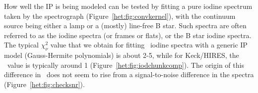 How well the IP is being modeled can be tested by fitting a pure
iodine spectrum taken by the spectrograph
(Figure~\ref{het:fig:convkernel}), with the continuum source being
either a lamp or a (mostly) line-free B star. Such spectra are often
referred to as the iodine spectra (or frames or flats), or the B star
iodine spectra. The typical $\chi_\nu^2$ value that we obtain for
fitting \het\ iodine spectra with a generic IP model (Gauss-Hermite
polynomials) is about 2-5, while for Keck/HIRES, the \chisq\ value is
typically around 1 (Figure~\ref{het:fig:iodchunkcomp}). The origin of
this difference in \chisq\ does not seem to rise from a
signal-to-noise difference in the spectra
(Figure~\ref{het:fig:checksnr}).


